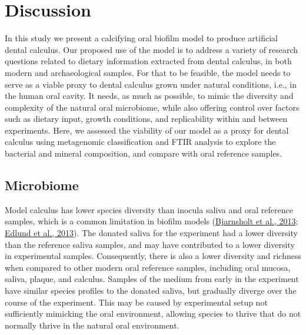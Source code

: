 \documentclass[
  b5paper,
]{book}
\begin{document}
\hypertarget{discussion}{%
\section{Discussion}\label{discussion}}

In this study we present a calcifying oral biofilm model to produce
artificial dental calculus. Our proposed use of the model is to address
a variety of research questions related to dietary information extracted
from dental calculus, in both modern and archaeological samples. For
that to be feasible, the model needs to serve as a viable proxy to
dental calculus grown under natural conditions, i.e., in the human oral
cavity. It needs, as much as possible, to mimic the diversity and
complexity of the natural oral microbiome, while also offering control
over factors such as dietary input, growth conditions, and replicability
within and between experiments. Here, we assessed the viability of our
model as a proxy for dental calculus using metagenomic classification
and FTIR analysis to explore the bacterial and mineral composition, and
compare with oral reference samples.

\hypertarget{microbiome}{%
\subsection{Microbiome}\label{microbiome}}

Model calculus has lower species diversity than inocula saliva and oral
reference samples, which is a common limitation in biofilm models
(\protect\hyperlink{ref-bjarnsholtVivoBiofilm2013}{Bjarnsholt et al.,
2013}; \protect\hyperlink{ref-edlundBiofilmModel2013}{Edlund et al.,
2013}). The donated saliva for the experiment had a lower diversity than
the reference saliva samples, and may have contributed to a lower
diversity in experimental samples. Consequently, there is also a lower
diversity and richness when compared to other modern oral reference
samples, including oral mucosa, saliva, plaque, and calculus. Samples of
the medium from early in the experiment have similar species profiles to
the donated saliva, but gradually diverge over the course of the
experiment. This may be caused by experimental setup not sufficiently
mimicking the oral environment, allowing species to thrive that do not
normally thrive in the natural oral environment.
\end{document}
